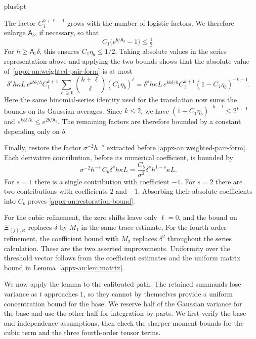 \documentclass[11pt,letterpaper,twoside,leqno]{article}
\makeatletter
\theoremstyle{bookplain}
\theoremstyle{bookremark}
\renewenvironment{proof}[1][\proofname]{\par
  \pushQED{\qed}\normalfont\topsep6pt plus6pt\relax
  \trivlist\item[\hskip\labelsep\bfseries #1\@addpunct{.}]\ignorespaces
}{\popQED\endtrivlist\@endpefalse}
\makeatother
\begin{document}
\begin{proof}
The factor $C_1^{k+\ell+1}$ grows with the number of logistic
factors. We therefore enlarge $\mathsf A_b$, if necessary, so that
\[
 C_1\bigl(e^{b/\mathsf A_b}-1\bigr)\le\tfrac12.
\]
For $h\ge\mathsf A_b\delta$, this ensures
$C_1\eta_b\le1/2$. Taking absolute values in the series
representation above and applying the two bounds shows that the
absolute value of~\eqref{appx-an:weighted-pair-form} is at most
\[
 \delta^s h\kappa L\,e^{kb\delta/h}C_1^{k+1}
 \sum_{\ell\ge0}\binom{k+\ell}{\ell}(C_1\eta_b)^\ell
 =\delta^s h\kappa L\,e^{kb\delta/h}C_1^{k+1}
       (1-C_1\eta_b)^{-k-1}.
\]
Here the same binomial-series identity used for the translation
now sums the bounds on its Gaussian averages. Since $k\le2$,
we have $(1-C_1\eta_b)^{-k-1}\le2^{k+1}$ and
$e^{kb\delta/h}\le e^{2b/\mathsf A_b}$. The remaining factors
are therefore bounded by a constant depending only on $b$.

Finally, restore the factor $\sigma^{-2}h^{-s}$ extracted before
\eqref{appx-an:weighted-pair-form}. Each derivative contribution,
before its numerical coefficient, is bounded by
\[
 \sigma^{-2}h^{-s}\,C_b\delta^s h\kappa L
 =\frac{C_b}{\sigma^2}\delta^s h^{1-s}\kappa L.
\]
For $s=1$ there is a single contribution with coefficient $-1$.
For $s=2$ there are two contributions with coefficients $2$ and
$-1$. Absorbing their absolute coefficients into $C_b$ proves
\eqref{appx-an:restoration-bound}.

For the cubic refinement, the zero shifts leave only $\ell=0$,
and the bound on $\Xi_{(j),\varnothing}$ replaces $\delta$ by
$M_1$ in the same trace estimate. For the fourth-order
refinement, the coefficient bound with $M_2$ replaces $\delta^2$
throughout the series calculation. These are the two asserted
improvements. Uniformity over the threshold vector follows from
the coefficient estimates and the uniform matrix bound in
Lemma~\ref{appx-an:lem:matrix}.
\end{proof}

We now apply the lemma to the calibrated path. The retained
summands lose variance as $t$ approaches $1$, so they cannot by
themselves provide a uniform concentration bound for the base.
We reserve half of the Gaussian variance for the base and use
the other half for integration by parts. We first verify the
base and independence assumptions, then check the sharper moment
bounds for the cubic term and the three fourth-order tensor terms.
\end{document}
